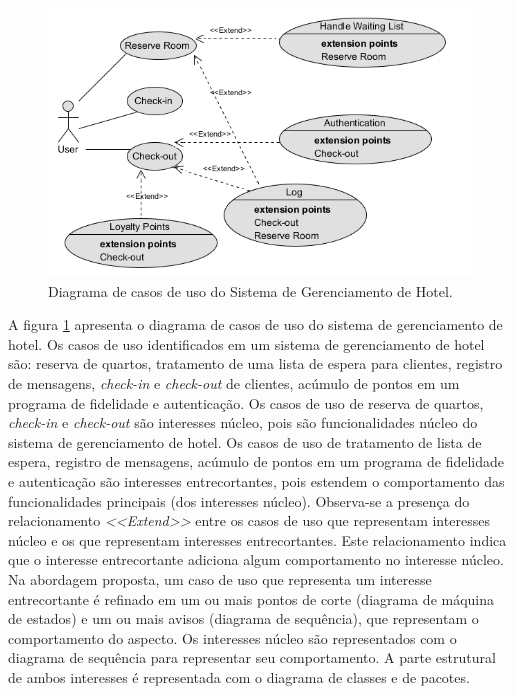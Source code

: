   \begin{figure}[!h]
	\centering
	\includegraphics[scale=0.8]{img/case_study_use_cases.png}
	\caption{Diagrama de casos de uso do Sistema de Gerenciamento de Hotel.}\label{fig:case_study_use_cases}
  \end{figure}

A figura \ref{fig:case_study_use_cases} apresenta o diagrama de casos de uso do sistema de gerenciamento de hotel. Os casos de uso identificados em um sistema de 
gerenciamento de hotel são: reserva de quartos, tratamento de uma lista de espera para clientes, registro de mensagens, \textit{check-in} e
\textit{check-out} de clientes, acúmulo de pontos em um programa de fidelidade e autenticação. Os casos de uso de reserva de quartos,
\textit{check-in} e \textit{check-out} são interesses núcleo, pois são funcionalidades núcleo do sistema de gerenciamento de hotel. Os casos de uso de 
tratamento de lista de espera, registro de mensagens, acúmulo de pontos em um programa de fidelidade e autenticação são interesses entrecortantes,
pois estendem o comportamento das funcionalidades principais (dos interesses núcleo). Observa-se a presença do relacionamento \textit{<<Extend>>}
entre os casos de uso que representam interesses núcleo e os que representam interesses entrecortantes. Este relacionamento indica que o interesse
entrecortante adiciona algum comportamento no interesse núcleo. Na abordagem proposta, um caso de uso que representa um interesse entrecortante é
refinado em um ou mais pontos de corte (diagrama de máquina de estados) e um ou mais avisos (diagrama de sequência), que representam o comportamento
do aspecto. Os interesses núcleo são representados com o diagrama de sequência para representar seu comportamento. A parte estrutural de ambos
interesses é representada com o diagrama de classes e de pacotes.

